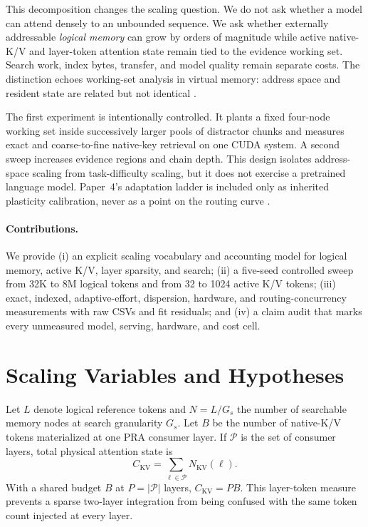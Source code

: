 \documentclass[10pt]{article}
\begin{document}
This decomposition changes the scaling question. We do not ask whether a model
can attend densely to an unbounded sequence. We ask whether externally
addressable \emph{logical memory} can grow by orders of magnitude while active
native-K/V and layer-token attention state remain tied to the evidence working
set. Search work, index bytes, transfer, and model quality remain separate costs.
The distinction echoes working-set analysis in virtual memory: address space and
resident state are related but not identical \cite{denning1968workingset}.

The first experiment is intentionally controlled. It plants a fixed four-node
working set inside successively larger pools of distractor chunks and measures
exact and coarse-to-fine native-key retrieval on one CUDA system. A second sweep
increases evidence regions and chain depth. This design isolates address-space
scaling from task-difficulty scaling, but it does not exercise a pretrained
language model. Paper~4's adaptation ladder is included only as inherited
plasticity calibration, never as a point on the routing curve
\cite{simao2026training}.

\paragraph{Contributions.}
We provide (i) an explicit scaling vocabulary and accounting model for logical
memory, active K/V, layer sparsity, and search; (ii) a five-seed controlled sweep
from 32K to 8M logical tokens and from 32 to 1024 active K/V tokens; (iii) exact,
indexed, adaptive-effort, dispersion, hardware, and routing-concurrency
measurements with raw CSVs and fit residuals; and (iv) a claim audit that marks
every unmeasured model, serving, hardware, and cost cell.

\section{Scaling Variables and Hypotheses}

Let $L$ denote logical reference tokens and $N=L/G_s$ the number of searchable
memory nodes at search granularity $G_s$. Let $B$ be the number of native-K/V
tokens materialized at one PRA consumer layer. If $\mathcal{P}$ is the set of
consumer layers, total physical attention state is
\begin{equation}
  C_{\mathrm{KV}} = \sum_{\ell\in\mathcal{P}} N_{\mathrm{KV}}(\ell).
\end{equation}
With a shared budget $B$ at $P=|\mathcal{P}|$ layers,
$C_{\mathrm{KV}}=PB$. This layer-token measure prevents a sparse two-layer
integration from being confused with the same token count injected at every
layer.
\end{document}
